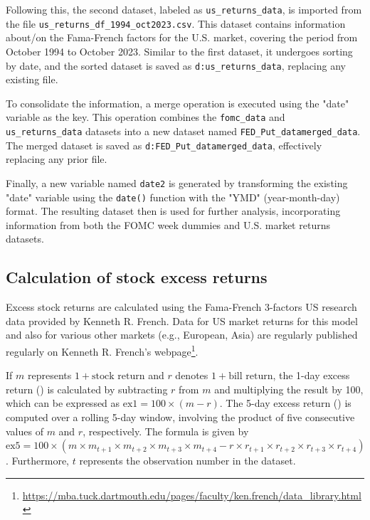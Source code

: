 Following this, the second dataset, labeled as \texttt{us\_returns\_data}, is imported from the file \texttt{us\_returns\_df\_1994\_oct2023.csv}. This dataset contains information about/on the Fama-French factors for the U.S. market, covering the period from October 1994 to October 2023. Similar to the first dataset, it undergoes sorting by date, and the sorted dataset is saved as \texttt{d:us\_returns\_data}, replacing any existing file.

To consolidate the information, a merge operation is executed using the "date" variable as the key. This operation combines the \texttt{fomc\_data} and \texttt{us\_returns\_data} datasets into a new dataset named \texttt{FED\_Put\_datamerged\_data}. The merged dataset is saved as \texttt{d:FED\_Put\_datamerged\_data}, effectively replacing any prior file.

Finally, a new variable named \texttt{date2} is generated by transforming the existing "date" variable using the \texttt{date()} function with the "YMD" (year-month-day) format. The resulting dataset then is used for further analysis, incorporating information from both the FOMC week dummies and U.S. market returns datasets.

\subsection{Calculation of stock excess returns}

Excess stock returns are calculated using the Fama-French 3-factors US research data provided by Kenneth R. French.
Data for US market returns for this model and also for various other markets (e.g., European, Asia) are regularly published regularly on Kenneth R. French's webpage\footnote{\url{https://mba.tuck.dartmouth.edu/pages/faculty/ken.french/data_library.html}}.

If \(m\) represents \(1 + \text{{stock return}}\) and \(r\) denotes \(1 + \text{{bill return}}\), the 1-day excess return () is calculated by subtracting \(r\) from \(m\) and multiplying the result by 100, which can be expressed as \(\text{{ex1}} = 100 \times (m - r)\). 
The 5-day excess return () is computed over a rolling 5-day window, involving the product of five consecutive values of \(m\) and \(r\), respectively. The formula is given by \(\text{{ex5}} = 100 \times (m \times m_{t+1} \times m_{t+2} \times m_{t+3} \times m_{t+4} - r \times r_{t+1} \times r_{t+2} \times r_{t+3} \times r_{t+4})\).
Furthermore, \(t\) represents the observation number in the dataset. 

